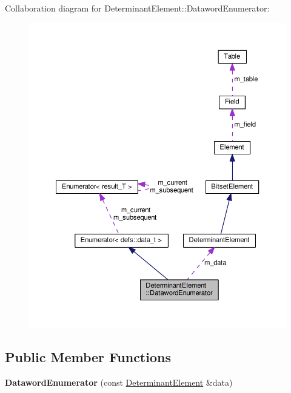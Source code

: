 Collaboration diagram for Determinant\+Element\+:\+:Dataword\+Enumerator\+:
\nopagebreak
\begin{figure}[H]
\begin{center}
\leavevmode
\includegraphics[width=350pt]{classDeterminantElement_1_1DatawordEnumerator__coll__graph}
\end{center}
\end{figure}
\subsection*{Public Member Functions}
\begin{DoxyCompactItemize}
\item 
{\bfseries Dataword\+Enumerator} (const \hyperlink{classDeterminantElement}{Determinant\+Element} \&data)\hypertarget{classDeterminantElement_1_1DatawordEnumerator_a17237d87203d5ad9874dd2326858f061}{}\label{classDeterminantElement_1_1DatawordEnumerator_a17237d87203d5ad9874dd2326858f061}

\end{DoxyCompactItemize}
